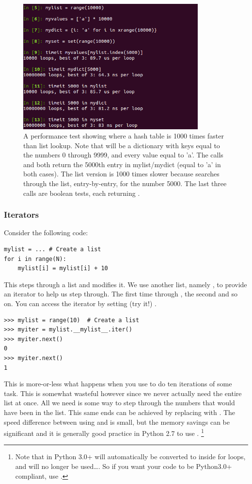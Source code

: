 \begin{figure}
  \includegraphics[width=0.85\textwidth]{../images/hash_test}
  \caption{A performance test showing where a hash table is 1000 times faster than list lookup.  Note that  will be a dictionary with keys equal to the numbers 0 through 9999, and every value equal to 'a'.   The calls  and  both return the 5000th entry in mylist/mydict (equal to 'a' in both cases).  The list version is 1000 times slower because  searches through the list, entry-by-entry, for the number 5000.  The last three calls are boolean tests, each returning .}
  \label{performance:fig:hash_test}
\end{figure}

\subsubsection{Iterators}
Consider the following code:
\begin{verbatim}
mylist = ... # Create a list
for i in range(N):
    mylist[i] = mylist[i] + 10    
\end{verbatim}
This steps through a list and modifies it.  We use another list, namely , to provide an iterator  to help us step through.  The first time through , the second  and so on.  You can access the iterator by setting (try it!) .
\begin{verbatim}
>>> mylist = range(10)  # Create a list
>>> myiter = mylist.__mylist__.iter()
>>> myiter.next()
0
>>> myiter.next()
1
\end{verbatim}
This is more-or-less what happens when you use  to do ten iterations of some task.  This is somewhat wasteful however since we never actually need the entire list at once.  All we need is some way to step through the numbers that would have been in the list.  This same ends can be achieved by replacing  with .  The speed difference between using  and  is small, but the memory savings can be significant and it is generally good practice in Python 2.7 to use .  \footnote{Note that in Python 3.0+  will automatically be converted to  inside for loops, and  will no longer be used\ldots.  So if you want your code to be Python3.0+ compliant, use .}

